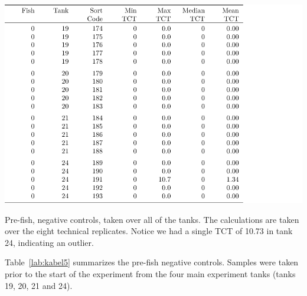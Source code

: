 \begin{table}[H]
\includegraphics{Chapter3Images/kable5fixed2.pdf}
\caption{ Pre-fish, negative controls, taken over all of the tanks. The calculations are taken over the eight technical replicates. Notice we had a single TCT of 10.73 in tank 24, indicating an outlier. }
\label{lab:kabel5}
\end{table}



Table~\ref{lab:kabel5} summarizes the pre-fish negative controls. Samples were taken prior to the start of the experiment from the four main experiment tanks (tanks 19, 20, 21 and 24).